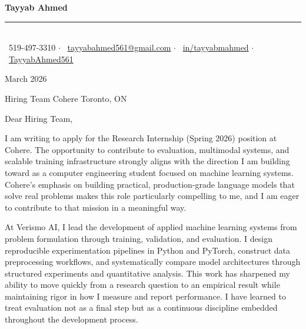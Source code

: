 \documentclass[11pt]{letter}
\begin{document}
\begin{center}
    {\fontsize{24}{28}\selectfont \textbf{\textcolor{BrightBlue}{Tayyab Ahmed}}} \\[0.3em]
    \textcolor{BrightBlue}{\rule{0.45\textwidth}{0.4pt}} \\[0.4em]
    \small
    \faPhone\ 519-497-3310
    \enspace\textcolor{BrightBlue}{$\cdot$}\enspace
    \faEnvelope\ \href{mailto:tayyabahmed561@gmail.com}{tayyabahmed561@gmail.com}
    \enspace\textcolor{BrightBlue}{$\cdot$}\enspace
    \faLinkedin\ \href{https://linkedin.com/in/tayyabmahmed/}{in/tayyabmahmed}
    \enspace\textcolor{BrightBlue}{$\cdot$}\enspace
    \faGithub\ \href{https://github.com/TayyabAhmed561}{TayyabAhmed561}
\end{center}

March 2026

Hiring Team
Cohere
Toronto, ON

\vspace{0.2em}

Dear Hiring Team,

\vspace{0.1em}

I am writing to apply for the Research Internship (Spring 2026) position at Cohere. The opportunity to contribute to evaluation, multimodal systems, and scalable training infrastructure strongly aligns with the direction I am building toward as a computer engineering student focused on machine learning systems. Cohere's emphasis on building practical, production-grade language models that solve real problems makes this role particularly compelling to me, and I am eager to contribute to that mission in a meaningful way.

At Verismo AI, I lead the development of applied machine learning systems from problem formulation through training, validation, and evaluation. I design reproducible experimentation pipelines in Python and PyTorch, construct data preprocessing workflows, and systematically compare model architectures through structured experiments and quantitative analysis. This work has sharpened my ability to move quickly from a research question to an empirical result while maintaining rigor in how I measure and report performance. I have learned to treat evaluation not as a final step but as a continuous discipline embedded throughout the development process.
\end{document}
